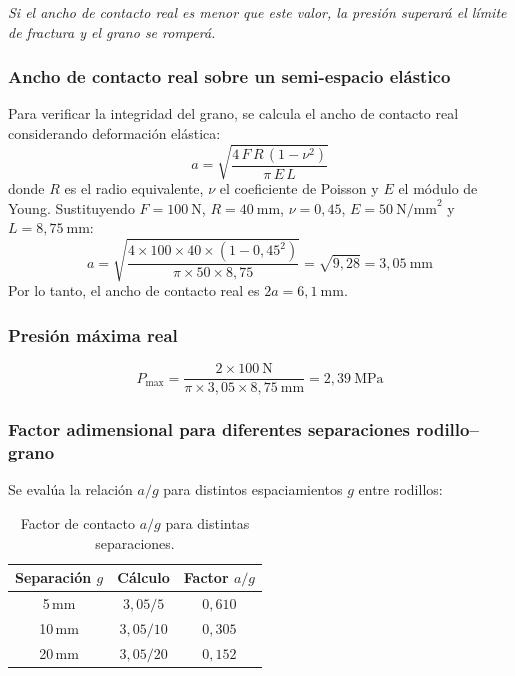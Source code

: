 \textit{Si el ancho de contacto real es menor que este valor, la presión superará el límite de fractura y el grano se romperá.}

\subsubsection{Ancho de contacto real sobre un semi-espacio elástico}
Para verificar la integridad del grano, se calcula el ancho de contacto real considerando deformación elástica:
\begin{equation}
a = \sqrt{\frac{4\, F\, R\, (1 - \nu^{2})}{\pi\, E\, L}}
\label{eq:a_real}
\end{equation}
\noindent donde $R$ es el radio equivalente, $\nu$ el coeficiente de Poisson y $E$ el módulo de Young. Sustituyendo $F = 100\ \text{N}$, $R = 40\ \text{mm}$, $\nu = 0{,}45$, $E = 50\ \text{N/mm}^{2}$ y $L = 8{,}75\ \text{mm}$:
\begin{equation}
a = \sqrt{\frac{4 \times 100 \times 40 \times (1 - 0{,}45^{2})}{\pi \times 50 \times 8{,}75}} = \sqrt{9{,}28} = 3{,}05\ \text{mm}
\end{equation}
\noindent Por lo tanto, el ancho de contacto real es $2a = 6{,}1\ \text{mm}$.

\subsubsection{Presión máxima real}
\begin{equation}
P_{\max} = \frac{2 \times 100\ \text{N}}{\pi \times 3{,}05 \times 8{,}75\ \text{mm}} = 2{,}39\ \text{MPa}
\label{eq:pmax_real}
\end{equation}

\subsubsection{Factor adimensional para diferentes separaciones rodillo--grano}
Se evalúa la relación $a/g$ para distintos espaciamientos $g$ entre rodillos:
\begin{table}[h!]
\centering
\caption{Factor de contacto $a/g$ para distintas separaciones.}
\label{tab:contacto}
\renewcommand{\arraystretch}{1.2}
\begin{tabular}{ccc}
\toprule
\textbf{Separación } $g$ & \textbf{Cálculo} & \textbf{Factor } $a/g$ \\
\midrule
5\,mm  & $3{,}05/5$  & $0{,}610$ \\
10\,mm & $3{,}05/10$ & $0{,}305$ \\
20\,mm & $3{,}05/20$ & $0{,}152$ \\
\bottomrule
\end{tabular}
\end{table}

